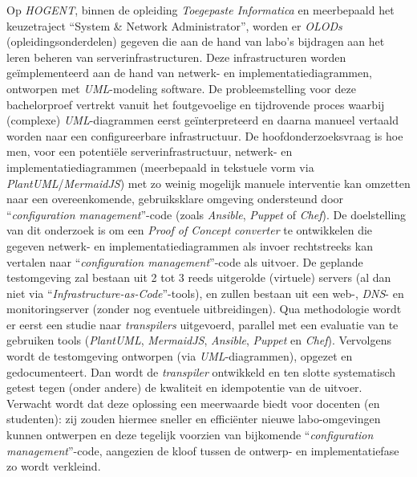 \documentclass[dutch,dit,thesis]{hogentreport}
\begin{document}
Op \emph{HOGENT}, binnen de opleiding \emph{Toegepaste Informatica} en meerbepaald het keuzetraject ``System \& Network Administrator'', worden er \emph{OLODs} (opleidingsonderdelen) gegeven die aan de hand van labo's bijdragen aan het leren beheren van serverinfrastructuren. Deze infrastructuren worden geïmplementeerd aan de hand van netwerk- en implementatiediagrammen, ontworpen met \emph{UML}-modeling software.
De probleemstelling voor deze bachelorproef vertrekt vanuit het foutgevoelige en tijdrovende proces waarbij (complexe) \emph{UML}-diagrammen eerst geïnterpreteerd en daarna manueel vertaald worden naar een configureerbare infrastructuur.
De hoofdonderzoeksvraag is hoe men, voor een potentiële serverinfrastructuur, netwerk- en implementatiediagrammen (meerbepaald in tekstuele vorm via \emph{PlantUML}/\emph{MermaidJS}) met zo weinig mogelijk manuele interventie kan omzetten naar een overeenkomende, gebruiksklare omgeving ondersteund door ``\emph{configuration management}''-code (zoals \emph{Ansible}, \emph{Puppet} of \emph{Chef}).
De doelstelling van dit onderzoek is om een \emph{Proof of Concept} \emph{converter} te ontwikkelen die gegeven netwerk- en implementatiediagrammen als invoer rechtstreeks kan vertalen naar ``\emph{configuration management}''-code als uitvoer.
De geplande testomgeving zal bestaan uit 2 tot 3 reeds uitgerolde (virtuele) servers (al dan niet via ``\emph{Infrastructure-as-Code}''-tools), en zullen bestaan uit een web-, \emph{DNS}- en monitoringserver (zonder nog eventuele uitbreidingen).
Qua methodologie wordt er eerst een studie naar \emph{transpilers} uitgevoerd, parallel met een evaluatie van te gebruiken tools (\emph{PlantUML}, \emph{MermaidJS}, \emph{Ansible}, \emph{Puppet} en \emph{Chef}). Vervolgens wordt de testomgeving ontworpen (via \emph{UML}-diagrammen), opgezet en gedocumenteert. Dan wordt de \emph{transpiler} ontwikkeld en ten slotte systematisch getest tegen (onder andere) de kwaliteit en idempotentie van de uitvoer.
Verwacht wordt dat deze oplossing een meerwaarde biedt voor docenten (en studenten): zij zouden hiermee sneller en efficiënter nieuwe labo-omgevingen kunnen ontwerpen en deze tegelijk voorzien van bijkomende ``\emph{configuration management}''-code, aangezien de kloof tussen de ontwerp- en implementatiefase zo wordt verkleind.



%


\backmatter{}

\setlength\bibitemsep{2pt} %
\printbibliography[heading=bibintoc]
\end{document}
